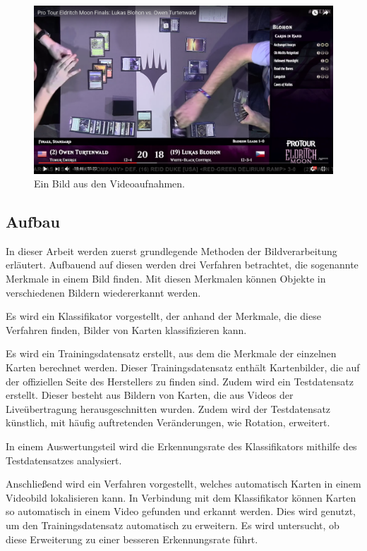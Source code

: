 \begin{figure}[h]
    \centering
		\includegraphics[scale=0.2]{bilder/screenshot.png}
    	\caption{Ein Bild aus den Videoaufnahmen.}
\label{fig:screenshot}
\end{figure}

\subsection{Aufbau} 

In dieser Arbeit werden zuerst grundlegende Methoden der Bildverarbeitung erläutert. Aufbauend auf diesen werden drei Verfahren betrachtet, die sogenannte Merkmale in einem Bild finden. Mit diesen Merkmalen können Objekte in verschiedenen Bildern wiedererkannt werden.


Es wird ein Klassifikator vorgestellt, der anhand der Merkmale, die diese Verfahren finden, Bilder von Karten klassifizieren kann.

Es wird ein Trainingsdatensatz erstellt, aus dem die Merkmale der einzelnen Karten berechnet werden. Dieser Trainingsdatensatz enthält Kartenbilder, die auf der offiziellen Seite des Herstellers zu finden sind.
 Zudem wird ein Testdatensatz erstellt. Dieser besteht aus Bildern von Karten, die aus Videos der Liveübertragung herausgeschnitten wurden. Zudem wird der Testdatensatz künstlich, mit häufig auftretenden Veränderungen, wie Rotation, erweitert. 

In einem Auswertungsteil wird die Erkennungsrate des Klassifikators mithilfe des Testdatensatzes analysiert.

Anschließend wird ein Verfahren vorgestellt, welches automatisch Karten in einem Videobild lokalisieren kann. In Verbindung mit dem Klassifikator können Karten so automatisch in einem Video gefunden und erkannt werden.
Dies wird genutzt, um den Trainingsdatensatz automatisch zu erweitern.
Es wird untersucht, ob diese Erweiterung zu einer besseren Erkennungsrate führt.
